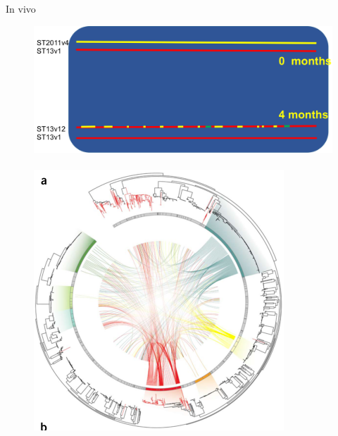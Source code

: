 \documentclass{beamer}
\begin{document}
\begin{frame}{In vivo}
\begin{figure}

\includegraphics[width=0.5\linewidth]{images/transfer-vivo.png}\\
\hspace*{11pt}\hbox{\scriptsize {}}\\
\includegraphics[width=0.3\linewidth]{images/phylogentic-crosses.png}\\
\hspace*{11pt}\hbox{\scriptsize {}}

\end{figure}
\end{frame}
\end{document}
